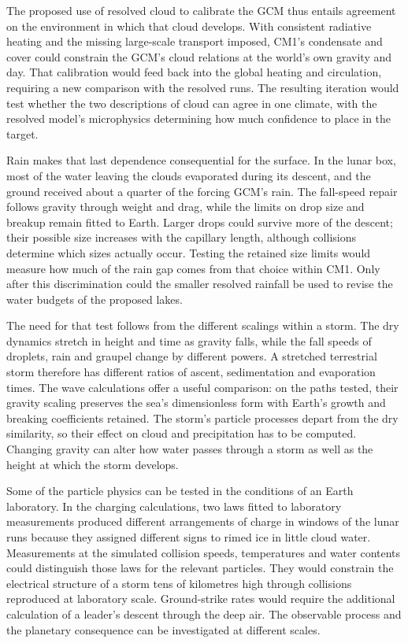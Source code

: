 The proposed use of resolved cloud to calibrate the GCM thus entails agreement on the environment in which
that cloud develops. With consistent radiative heating and the missing large-scale transport imposed,
CM1's condensate and cover could constrain the GCM's cloud relations at the world's own gravity and day.
That calibration would feed back into the global heating and circulation, requiring a new comparison with
the resolved runs. The resulting iteration would test whether the two descriptions of cloud can agree in
one climate, with the resolved model's microphysics determining how much confidence to place in the target.

Rain makes that last dependence consequential for the surface. In the lunar box, most of the water leaving
the clouds evaporated during its descent, and the ground received about a quarter of the forcing GCM's rain.
The fall-speed repair follows gravity through weight and drag, while the limits on drop size and breakup
remain fitted to Earth. Larger drops could survive more of the descent; their possible size increases with
the capillary length, although collisions determine which sizes actually occur. Testing the retained size
limits would measure how much of the rain gap comes from that choice within CM1. Only after this
discrimination could the smaller resolved rainfall be used to revise the water budgets of the proposed lakes.

The need for that test follows from the different scalings within a storm. The dry dynamics stretch in
height and time as gravity falls, while the fall speeds of droplets, rain and graupel change by different
powers. A stretched terrestrial storm therefore has different ratios of ascent, sedimentation and
evaporation times. The wave calculations offer a useful comparison: on the paths tested, their gravity
scaling preserves the sea's dimensionless form with Earth's growth and breaking coefficients retained.
The storm's particle processes depart from the dry similarity, so their effect on cloud and precipitation
has to be computed. Changing gravity can alter how water passes through a storm as well as the height at
which the storm develops.

Some of the particle physics can be tested in the conditions of an Earth laboratory. In the charging
calculations, two laws fitted to laboratory measurements produced different arrangements of charge in
windows of the lunar runs because they assigned different signs to rimed ice in little cloud water.
Measurements at the simulated collision speeds, temperatures and water contents could distinguish those
laws for the relevant particles. They would constrain the electrical structure of a storm tens of
kilometres high through collisions reproduced at laboratory scale. Ground-strike rates would require the
additional calculation of a leader's descent through the deep air. The observable process and the
planetary consequence can be investigated at different scales.


